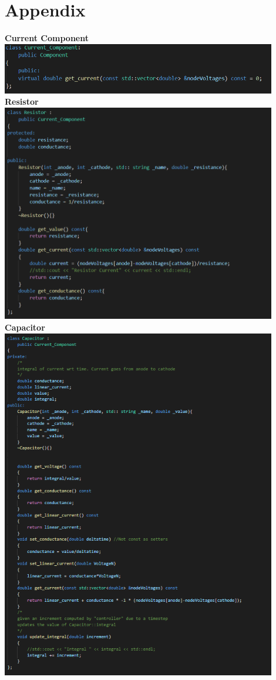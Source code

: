 \documentclass{article}
\begin{document}
\newpage






\appendix
\section{Appendix}
\textbf{Current Component}
\bigbreak
\includegraphics[width=12cm]{images/Current_Component.PNG}
\bigbreak
\textbf{Resistor}
\bigbreak
\includegraphics[width=12cm]{images/Resistor.PNG}
\bigbreak
\newpage
\textbf{Capacitor}
\bigbreak
\includegraphics[width=12cm]{images/Capacitor.PNG}
\end{document}
